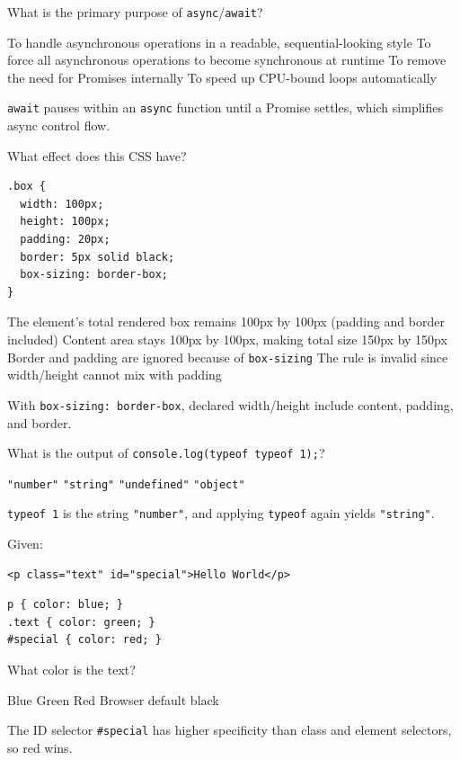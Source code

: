 \question[4]
What is the primary purpose of \texttt{async}/\texttt{await}?
\begin{choices}
  \CorrectChoice To handle asynchronous operations in a readable, sequential-looking style
  \choice To force all asynchronous operations to become synchronous at runtime
  \choice To remove the need for Promises internally
  \choice To speed up CPU-bound loops automatically
\end{choices}
\begin{solution}
  \texttt{await} pauses within an \texttt{async} function until a Promise settles, which simplifies async control flow.
\end{solution}

\question[4]
What effect does this CSS have?
\begin{lstlisting}[style=cssinline]
.box {
  width: 100px;
  height: 100px;
  padding: 20px;
  border: 5px solid black;
  box-sizing: border-box;
}
\end{lstlisting}
\begin{choices}
  \CorrectChoice The element's total rendered box remains 100px by 100px (padding and border included)
  \choice Content area stays 100px by 100px, making total size 150px by 150px
  \choice Border and padding are ignored because of \texttt{box-sizing}
  \choice The rule is invalid since width/height cannot mix with padding
\end{choices}
\begin{solution}
  With \texttt{box-sizing: border-box}, declared width/height include content, padding, and border.
\end{solution}

\question[4]
What is the output of \texttt{console.log(typeof typeof 1);}?
\begin{choices}
  \choice \texttt{"number"}
  \CorrectChoice \texttt{"string"}
  \choice \texttt{"undefined"}
  \choice \texttt{"object"}
\end{choices}
\begin{solution}
  \texttt{typeof 1} is the string \texttt{"number"}, and applying \texttt{typeof} again yields \texttt{"string"}.
\end{solution}

\question[4]
Given:
\begin{lstlisting}[style=htmlinline]
<p class="text" id="special">Hello World</p>
\end{lstlisting}
\begin{lstlisting}[style=cssinline]
p { color: blue; }
.text { color: green; }
#special { color: red; }
\end{lstlisting}
What color is the text?
\begin{choices}
  \choice Blue
  \choice Green
  \CorrectChoice Red
  \choice Browser default black
\end{choices}
\begin{solution}
  The ID selector \texttt{\#special} has higher specificity than class and element selectors, so red wins.
\end{solution}

